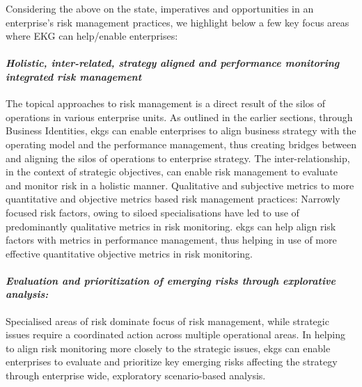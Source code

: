 %
%
Considering the above on the state, imperatives and opportunities in an enterprise’s risk management practices,
we highlight below a few key focus areas where EKG can help/enable enterprises:

\paragraph*{\textit{Holistic, inter-related, strategy aligned and performance monitoring integrated risk management}}

The topical approaches to risk management is a direct result of the silos of operations in various enterprise units.
As outlined in the earlier sections, through Business Identities,
\glspl{ekg} can enable enterprises to align business strategy with the operating model and the performance management,
thus creating bridges between and aligning the silos of operations to enterprise strategy.
The inter-relationship, in the context of strategic objectives,
can enable risk management to evaluate and monitor risk in a holistic manner.
Qualitative and subjective metrics to more quantitative and objective metrics based risk management practices:
Narrowly focused risk factors, owing to siloed specialisations have led to use of predominantly qualitative metrics
in risk monitoring.
\Glspl{ekg} can help align risk factors with metrics in performance management,
thus helping in use of more effective quantitative objective metrics in risk monitoring.

\paragraph*{\textit{Evaluation and prioritization of emerging risks through explorative analysis:}}

Specialised areas of risk dominate focus of risk management, while strategic issues require a coordinated action
across multiple operational areas.
In helping to align risk monitoring more closely to the strategic issues,
\glspl{ekg} can enable enterprises to evaluate and prioritize key emerging risks affecting the strategy
through enterprise wide, exploratory scenario-based analysis.
